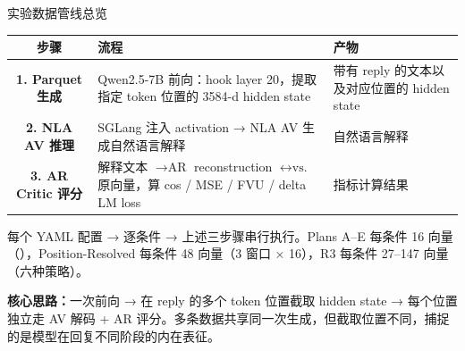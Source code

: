 % 

\footnotesize

\begin{frame}{实验数据管线总览}
\begin{tabularx}{\linewidth}{cXl}
\toprule
步骤 & 流程 & 产物 \\
\midrule
\textbf{1. Parquet 生成} & Qwen2.5-7B 前向：hook layer 20，提取指定 token 位置的 3584-d hidden state & 带有 reply 的文本以及对应位置的 hidden state \\
\textbf{2. NLA AV 推理} & SGLang 注入 activation → NLA AV 生成自然语言解释 & 自然语言解释 \\
\textbf{3. AR Critic 评分} & 解释文本 $\rightarrow{\text{AR}}$ reconstruction $\leftrightarrow{\text{vs.}}$ 原向量，算 cos / MSE / FVU / delta LM loss & 指标计算结果 \\
\bottomrule
\end{tabularx}

\vspace{0.6em}
每个 YAML 配置 → 逐条件 → 上述三步骤串行执行。Plans A–E 每条件 16 向量（），Position-Resolved 每条件 48 向量（3 窗口 × 16），R3 每条件 27–147 向量（六种策略）。

\vspace{0.4em}
\textbf{核心思路：}一次前向 → 在 reply 的多个 token 位置截取 hidden state → 每个位置独立走 AV 解码 + AR 评分。多条数据共享同一次生成，但截取位置不同，捕捉的是模型在回复不同阶段的内在表征。
\end{frame}


